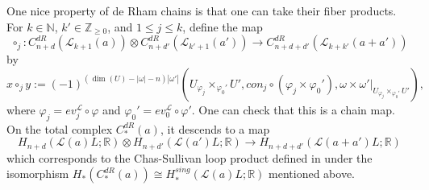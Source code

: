 \documentclass[a4paper]{article}
\numberwithin{equation}{section}
\begin{document}
One nice property of de Rham chains is that one can take their fiber products. For $k\in\mathbb{N}$, $k'\in\mathbb{Z}_{\geq0}$, and $1\leq j\leq k$, define the map
\begin{equation}\label{eq:fp}
\circ_j:C_{n+d}^\mathit{dR}(\mathcal{L}_{k+1}(a))\otimes C_{n+d'}^\mathit{dR}\left(\mathcal{L}_{k'+1}(a')\right)\rightarrow C_{n+d+d'}^\mathit{dR}\left(\mathcal{L}_{k+k'}(a+a')\right)
\end{equation}
by
\begin{equation}
x\circ_jy:=(-1)^{(\dim(U)-|\omega|-n)|\omega'|}\left(U{{}_{\varphi_j}\times_{\varphi_0'}}U',\mathit{con}_j\circ(\varphi_j\times\varphi_0'),\omega\times\omega'|_{U{{}_{\varphi_j}\times_{\varphi_0'}}U'}\right),
\end{equation}
where $\varphi_j=\mathit{ev}_j^\mathcal{L}\circ\varphi$ and $\varphi_0'=\mathit{ev}_0^\mathcal{L}\circ\varphi'$. One can check that this is a chain map. On the total complex $C_\ast^\mathit{dR}(a)$, it descends to a map
\begin{equation}
H_{n+d}(\mathcal{L}(a)L;\mathbb{R})\otimes H_{n+d'}\left(\mathcal{L}(a')L;\mathbb{R}\right)\rightarrow H_{n+d+d'}\left(\mathcal{L}(a+a')L;\mathbb{R}\right)
\end{equation}
which corresponds to the Chas-Sullivan loop product defined in \cite{cs} under the isomorphism $H_\ast\left(C_\ast^\mathit{dR}(a)\right)\cong H_\ast^\mathit{sing}(\mathcal{L}(a)L;\mathbb{R})$ mentioned above.
\bigskip
\end{document}
